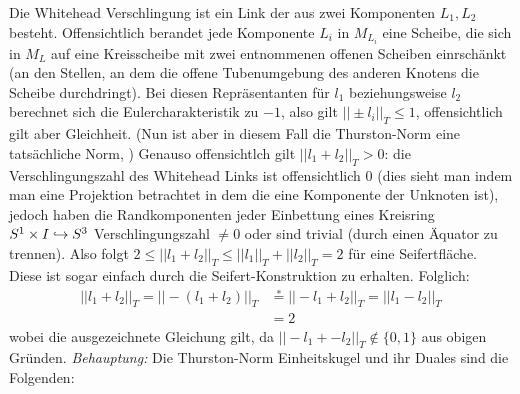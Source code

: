         Die Whitehead Verschlingung ist ein Link der aus zwei Komponenten $L_1,L_2$ besteht. Offensichtlich berandet jede Komponente $L_i$ in $M_{L_i}$ eine Scheibe, die sich in $M_L$ auf eine Kreisscheibe mit zwei entnommenen offenen Scheiben einrschänkt (an den Stellen, an dem die offene Tubenumgebung des anderen Knotens die Scheibe durchdringt). Bei diesen Repräsentanten für $l_1$ beziehungsweise $l_2$ berechnet sich die Eulercharakteristik zu $-1$, also gilt $||\pm l_i||_T\leq 1$, offensichtlich gilt aber Gleichheit. (Nun ist aber in diesem Fall die Thurston-Norm eine tatsächliche Norm, ) Genauso offensichtlch gilt $||l_1+l_2||_T>0$: die Verschlingungszahl des Whitehead Links ist offensichtlich $0$ (dies sieht man indem man eine Projektion betrachtet in dem die eine Komponente der Unknoten ist), jedoch haben die Randkomponenten jeder Einbettung eines Kreisring $S^1\times I \hookrightarrow S^3$ Verschlingungszahl $\neq 0$ oder sind trivial (durch einen Äquator zu trennen). Also folgt $2 \leq ||l_1+l_2||_T \leq ||l_1||_T+||l_2||_T =2$ für eine Seifertfläche. Diese ist sogar einfach durch die Seifert-Konstruktion zu erhalten. Folglich:
        \begin{align*}
            ||l_1+l_2||_T =||-(l_1+l_2)||_T &\stackrel * = ||-l_1+l_2||_T = ||l_1-l_2||_T \\
            &=2
        \end{align*}
        wobei die ausgezeichnete Gleichung gilt, da $||-l_1+-l_2||_T\not \in \{0,1\}$ aus obigen Gründen.
        \emph{Behauptung:} Die Thurston-Norm Einheitskugel und ihr Duales sind die Folgenden:\\
